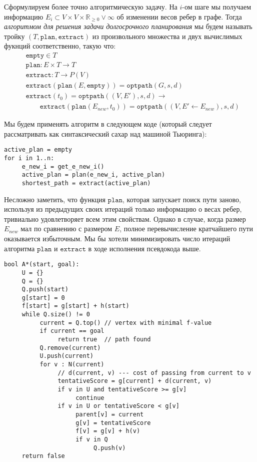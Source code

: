 \documentclass[11pt]{article}
\newcommand{\realpositive}{\mathbb{R}_{\geqslant 0}}
\begin{document}
     \pagebreak
     \newcommand{\fplan}{\mathtt{plan}}
     \newcommand{\fextract}{\mathtt{extract}}
     \newcommand{\fempty}{\mathtt{empty}}
     Сформулируем более точно алгоритмическую задачу.
     На $i$-ом шаге мы получаем информацию $E_i \subset V \times V \times \realpositive \lor \infty$ об изменении весов ребер в графе.
     Тогда \textit{алгоритмом для решения задачи долгосрочного планирования} мы будем называть тройку $(T, \fplan, \fextract)$ из произвольного множества и двух вычислимых фукнций соответственно, такую что:
     \begin{align*}
          &\fempty \in T \\
          &\fplan: E \times T \rightarrow T \\
          &\fextract: T \rightarrow P(V) \\
          &\fextract(\fplan(E, \fempty)) = \mathtt{optpath}(G, s, d) \\
          &\fextract(t_0) = \mathtt{optpath}((V, E'), s, d) \rightarrow \\
          &\qquad \fextract(\fplan(E_{new}, t_0)) = \mathtt{optpath}((V, E' \leftarrow E_{new}), s, d)
     \end{align*}

     Мы будем применять алгоритм в следующем коде (который следует рассматривать как синтаксический сахар над машиной Тьюринга):
     \begin{verbatim}
active_plan = empty
for i in 1..n:
     e_new_i = get_e_new_i()
     active_plan = plan(e_new_i, active_plan)
     shortest_path = extract(active_plan)
     \end{verbatim}
     Несложно заметить, что функция $\fplan$, которая запускает поиск пути заново, используя из предыдущих своих итераций только информацию о весах ребер, тривиально удовлетворяет всем этим свойствам.
     Однако в случае, когда размер $E_{new}$ мал по сравнению с размером $E$, полное перевычисление кратчайшего пути оказывается избыточным.
     Мы бы хотели минимизировать число итераций алгоритма $\fplan$ и $\fextract$ в ходе исполнения псевдокода выше.



\begin{verbatim}
bool A*(start, goal):
     U = {}
     Q = {}
     Q.push(start)
     g[start] = 0
     f[start] = g[start] + h(start)
     while Q.size() != 0
          current = Q.top() // vertex with minimal f-value
          if current == goal
               return true  // path found
          Q.remove(current)
          U.push(current)
          for v : N(current)
               // d(current, v) --- cost of passing from current to v
               tentativeScore = g[current] + d(current, v)
               if v in U and tentativeScore >= g[v]
                    continue
               if v in U or tentativeScore < g[v]
                    parent[v] = current
                    g[v] = tentativeScore
                    f[v] = g[v] + h(v)
                    if v in Q
                         Q.push(v)
     return false
\end{verbatim}
\end{document}
